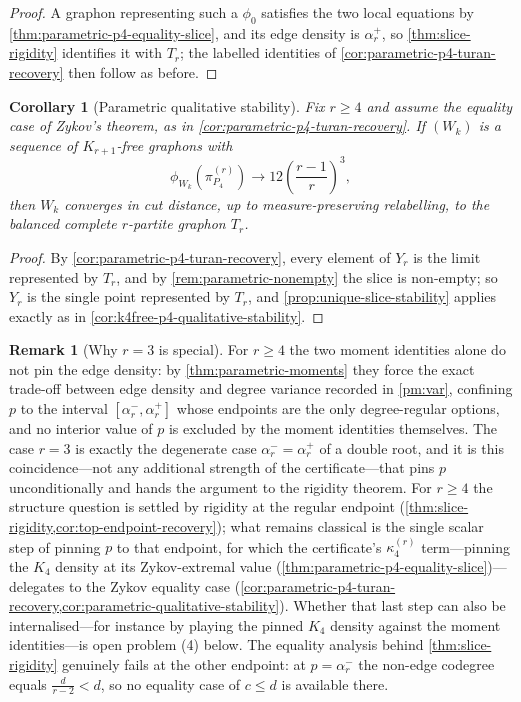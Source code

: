 \documentclass[11pt]{article}
\newtheorem{corollary}[corollary]{Corollary}
\theoremstyle{definition}
\newtheorem{remark}[remark]{Remark}
\begin{document}
\begin{proof}
A graphon representing such a $\phi_0$ satisfies the two local equations by
\cref{thm:parametric-p4-equality-slice}, and its edge density is $\alpha_r^+$, so
\cref{thm:slice-rigidity} identifies it with $T_r$; the labelled identities of
\cref{cor:parametric-p4-turan-recovery} then follow as before.
\end{proof}

\begin{corollary}[Parametric qualitative stability]\label{cor:parametric-qualitative-stability}
Fix $r\ge4$ and assume the equality case of Zykov's theorem, as in
\cref{cor:parametric-p4-turan-recovery}.  If $(W_k)$ is a sequence of $K_{r+1}$-free
graphons with
\[
  \phi_{W_k}(\pi_{P_4}^{(r)})\longrightarrow12\left(\frac{r-1}{r}\right)^3,
\]
then $W_k$ converges in cut distance, up to measure-preserving relabelling, to the
balanced complete $r$-partite graphon $T_r$.
\end{corollary}

\begin{proof}
By \cref{cor:parametric-p4-turan-recovery}, every element of $Y_r$ is the limit
represented by $T_r$, and by \cref{rem:parametric-nonempty} the slice is non-empty; so
$Y_r$ is the single point represented by $T_r$, and
\cref{prop:unique-slice-stability} applies exactly as in
\cref{cor:k4free-p4-qualitative-stability}.
\end{proof}

\begin{remark}[Why $r=3$ is special]\label{rem:r3-special}
For $r\ge4$ the two moment identities alone do not pin the edge density: by
\cref{thm:parametric-moments} they force the exact trade-off between edge density and
degree variance recorded in \ref{pm:var}, confining $p$ to the interval
$[\alpha_r^-,\alpha_r^+]$ whose endpoints are the only degree-regular options, and no
interior value of $p$ is excluded by the moment identities themselves.  The case $r=3$
is exactly the degenerate case $\alpha_r^-=\alpha_r^+$ of a double root, and it is this
coincidence---not any additional strength of the certificate---that pins $p$
unconditionally and hands the argument to the rigidity theorem.  For $r\ge4$ the
structure question is settled by rigidity at the regular endpoint
(\cref{thm:slice-rigidity,cor:top-endpoint-recovery}); what remains classical is the
single scalar step of pinning $p$ to that endpoint, for which the certificate's
$\kappa_4^{(r)}$ term---pinning the $K_4$ density at its Zykov-extremal value
(\cref{thm:parametric-p4-equality-slice})---delegates to the Zykov equality case
(\cref{cor:parametric-p4-turan-recovery,cor:parametric-qualitative-stability}).
Whether that last step can also be internalised---for instance by playing the pinned
$K_4$ density against the moment identities---is open problem (4) below.  The equality
analysis behind \cref{thm:slice-rigidity} genuinely fails at the other endpoint: at
$p=\alpha_r^-$ the non-edge codegree equals $\frac{d}{r-2}<d$, so no equality case of
$c\le d$ is available there.
\end{remark}
\end{document}
